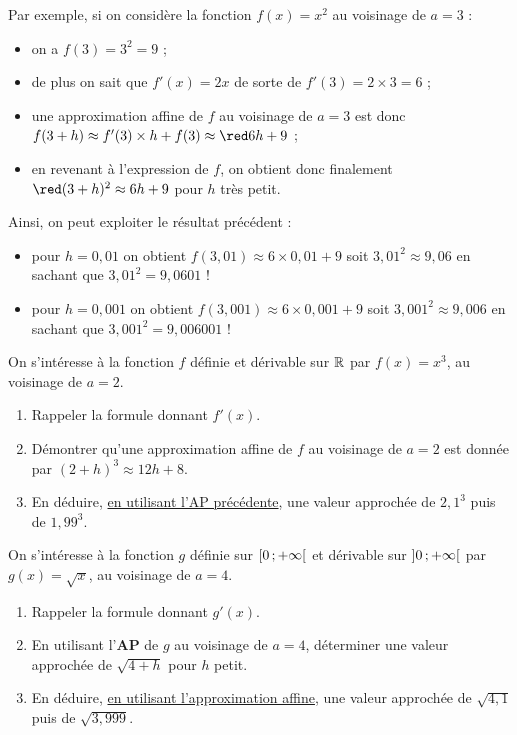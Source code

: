\documentclass[a4paper,11pt]{article}
\begin{document}
\begin{cexemple}
Par exemple, si on considère la fonction $f(x)=x^2$ au voisinage de $a=3$ :
%
\begin{itemize}
	\item on a $f(3)=3^2=9$ ;
	\item de plus on sait que $f'(x)=2x$ de sorte de $f'(3)=2 \times 3 = 6$ ;
	\item une approximation affine de $f$ au voisinage de $a=3$ est donc $f(3+h) \approx f'(3) \times h + f(3) \approx {\red 6h + 9}$ ;
	\item en \og revenant \fg{} à l'expression de $f$, on obtient donc finalement ${\red (3+h)^2 \approx 6h + 9}$ pour $h$ très petit.
\end{itemize}
%
Ainsi, on peut exploiter le résultat précédent :
%
\begin{itemize}
	\item pour $h=0,01$ on obtient $f(3,01) \approx 6 \times 0,01 + 9$ soit $3,01^2 \approx 9,06$ en sachant que $3,01^2 = 9,0601$ !
	\item pour $h=0,001$ on obtient $f(3,001) \approx 6 \times 0,001 + 9$ soit $3,001^2 \approx 9,006$ en sachant que $3,001^2 = 9,006001$ !
\end{itemize}
\end{cexemple}

\begin{cblocdm}[ n°1]
On s'intéresse à la fonction $f$ définie et dérivable sur $\R$ par $f(x)=x^3$, au voisinage de $a=2$.
%
\begin{enumerate}[noitemsep,topsep=4pt]
	\item Rappeler la formule donnant $f'(x)$.
	\item Démontrer qu'une approximation affine de $f$ au voisinage de $a=2$ est donnée par $(2+h)^3 \approx 12h+8$.
	\item En déduire, \uline{en utilisant l'AP précédente}, une valeur approchée de $2,1^3$ puis de $1,99^3$.
\end{enumerate}
\end{cblocdm}

\begin{cblocdm}[ n°2]
On s'intéresse à la fonction $g$ définie sur $\mbox{\ensuremath{\left[0\mathpunct{};+\infty\right[}}$ et dérivable sur $\mbox{\ensuremath{\left]0\mathpunct{};+\infty\right[}}$ par $g(x)=\sqrt{x}$, au voisinage de $a=4$.
%
\begin{enumerate}[noitemsep,topsep=4pt]
	\item Rappeler la formule donnant $g'(x)$.
	\item En utilisant l'\textbf{AP} de $g$ au voisinage de $a=4$, déterminer une valeur approchée de $\sqrt{4+h}$ pour $h$ petit.
	\item En déduire, \uline{en utilisant l'approximation affine}, une valeur approchée de $\sqrt{4,1}$ puis de $\sqrt{3,999}$.
\end{enumerate}
\end{cblocdm}
\end{document}

